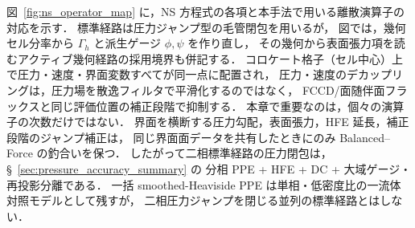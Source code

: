 図~\ref{fig:ns_operator_map} に，NS 方程式の各項と本手法で用いる離散演算子の対応を示す．
標準経路は圧力ジャンプ型の毛管閉包を用いるが，
図では，幾何セル分率から $\Gamma_h$ と派生ゲージ $\phi,\psi$ を作り直し，
その幾何から表面張力項を読むアクティブ幾何経路の採用境界も併記する．
コロケート格子（セル中心）上で圧力・速度・界面変数すべてが同一点に配置され，
圧力・速度のデカップリングは，圧力場を散逸フィルタで平滑化するのではなく，
FCCD/面随伴面フラックスと同じ評価位置の補正段階で抑制する．
本章で重要なのは，個々の演算子の次数だけではない．
界面を横断する圧力勾配，表面張力，HFE 延長，補正段階のジャンプ補正は，
同じ界面面データを共有したときにのみ Balanced--Force の釣合いを保つ．
したがって二相標準経路の圧力閉包は，§~\ref{sec:pressure_accuracy_summary} の
分相 PPE + HFE + DC + 大域ゲージ・再投影分離である．
一括 smoothed-Heaviside PPE は単相・低密度比の一流体対照モデルとして残すが，
二相圧力ジャンプを閉じる並列の標準経路とはしない．


